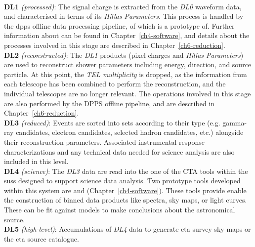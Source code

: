 \\[4pt]
\indent\textbf{DL1} \textit{(processed)}: The signal charge is extracted from the \textit{DL0} waveform data, and characterised in terms of its \textit{Hillas Parameters}. This process is handled by the \gls{dpps} offline data processing pipeline, of which  is a prototype of. Further information about  can be found in Chapter~\ref{ch4-software}, and details about the processes involved in this stage are described in Chapter~\ref{ch6-reduction}.
\\[4pt]
\indent\textbf{DL2} \textit{(reconstructed)}: The \textit{DL1} products (pixel charges and \textit{Hillas Parameters}) are used to reconstruct shower parameters including energy, direction, and source particle. At this point, the \textit{TEL multiplicity} is dropped, as the information from each telescope has been combined to perform the reconstruction, and the individual telescopes are no longer relevant. The operations involved in this stage are also performed by the DPPS offline pipeline, and are described in Chapter~\ref{ch6-reduction}.
\\[4pt]
\indent\textbf{DL3} \textit{(reduced)}:
Events are sorted into sets according to their type (e.g. gamma-ray candidates, electron candidates, selected hadron
candidates, etc.) alongside their reconstruction parameters. Associated instrumental response characterizations and any technical data needed for
science analysis are also included in this level.
\\[4pt]
\indent\textbf{DL4} \textit{(science)}:
The \textit{DL3} data are read into the one of  the CTA tools within the \gls{suss} designed to support science data analysis. Two prototype tools developed within this system are  and  (Chapter~\ref{ch4-software}). These tools provide enable the construction of binned data products like spectra, sky maps, or light curves. These can be fit against models to make conclusions about the astronomical source.
\\[4pt]
\indent\textbf{DL5} \textit{(high-level)}:
Accumulations of \textit{DL4} data to generate \gls{cta} survey sky maps or the \gls{cta}
source catalogue.